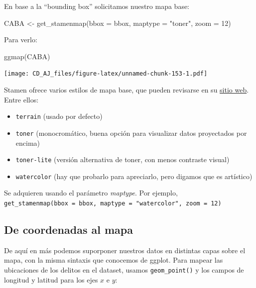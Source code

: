 \documentclass[
]{book}
\newenvironment{Shaded}{\begin{snugshade}}{\end{snugshade}}
\newcommand{\AttributeTok}[1]{\textcolor[rgb]{0.77,0.63,0.00}{#1}}
\newcommand{\DecValTok}[1]{\textcolor[rgb]{0.00,0.00,0.81}{#1}}
\newcommand{\FunctionTok}[1]{\textcolor[rgb]{0.00,0.00,0.00}{#1}}
\newcommand{\NormalTok}[1]{#1}
\newcommand{\OtherTok}[1]{\textcolor[rgb]{0.56,0.35,0.01}{#1}}
\newcommand{\StringTok}[1]{\textcolor[rgb]{0.31,0.60,0.02}{#1}}
\providecommand{\tightlist}{%
  \setlength{\itemsep}{0pt}\setlength{\parskip}{0pt}}
\begin{document}
En base a la ``bounding box'' solicitamos nuestro mapa base:

\begin{Shaded}
\begin{Highlighting}[]
\NormalTok{CABA }\OtherTok{\textless{}{-}} \FunctionTok{get\_stamenmap}\NormalTok{(}\AttributeTok{bbox =}\NormalTok{ bbox, }\AttributeTok{maptype =} \StringTok{"toner"}\NormalTok{, }\AttributeTok{zoom =} \DecValTok{12}\NormalTok{)}
\end{Highlighting}
\end{Shaded}

Para verlo:

\begin{Shaded}
\begin{Highlighting}[]
\FunctionTok{ggmap}\NormalTok{(CABA)}
\end{Highlighting}
\end{Shaded}

\texttt{[image: CD\_AJ\_files/figure-latex/unnamed-chunk-153-1.pdf]}

Stamen ofrece varios estilos de mapa base, que pueden revisarse en su \href{http://maps.stamen.com}{sitio web}.
Entre ellos:

\begin{itemize}
\tightlist
\item
  \texttt{terrain} (usado por defecto)
\item
  \texttt{toner} (monocromático, buena opción para visualizar datos proyectados por encima)
\item
  \texttt{toner-lite} (versión alternativa de toner, con menos contraste visual)
\item
  \texttt{watercolor} (hay que probarlo para apreciarlo, pero digamos que es artístico)
\end{itemize}

Se adquieren usando el parámetro \emph{maptype}.
Por ejemplo, \texttt{get\_stamenmap(bbox\ =\ bbox,\ maptype\ =\ "watercolor",\ zoom\ =\ 12)}

\hypertarget{de-coordenadas-al-mapa}{%
\subsection{De coordenadas al mapa}\label{de-coordenadas-al-mapa}}

De aquí en más podemos suporponer nuestros datos en distintas capas sobre el mapa, con la misma sintaxis que conocemos de ggplot. Para mapear las ubicaciones de los delitos en el dataset, usamos \texttt{geom\_point()} y los campos de longitud y latitud para los ejes \(x\) e \(y\):
\end{document}
